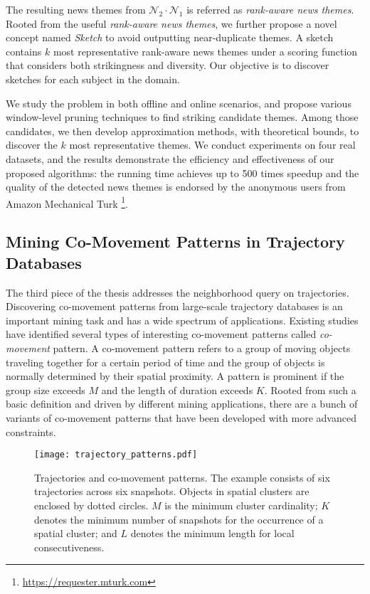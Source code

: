 The resulting news themes from $\mathcal{N}_2 \cdot \mathcal{N}_1$ is referred as \emph{rank-aware news themes}. Rooted from the useful \emph{rank-aware news themes}, we further propose
a novel concept named \emph{Sketch} to avoid outputting near-duplicate themes.
A sketch contains $k$ most representative rank-aware news themes under a scoring function that considers both strikingness and diversity.  Our objective is to discover sketches for each subject in the domain.

We study the problem in both
offline and online scenarios, and propose various window-level 
pruning techniques to find striking candidate themes.
Among those candidates, we then develop approximation
methods, with theoretical bounds, to discover the $k$ most
representative themes. We conduct experiments on four real
datasets, and the results demonstrate the efficiency and 
effectiveness of our proposed algorithms: the running time
achieves up to 500 times speedup and the quality of the
detected news themes is endorsed by the anonymous users
from Amazon Mechanical Turk \footnote{\url{https://requester.mturk.com}}.

\subsection{Mining Co-Movement Patterns in Trajectory Databases}
The third piece of the thesis addresses the neighborhood
query on trajectories.
Discovering co-movement patterns from large-scale trajectory 
databases is an important mining task and has a wide
spectrum of applications. 
Existing studies have identified several types of interesting co-movement patterns called \emph{co-movement} pattern. A co-movement pattern refers to a group of moving objects traveling together for a certain period of time and the group of objects is normally determined by their spatial proximity. A pattern is prominent if the group size exceeds $M$ and the length of duration exceeds $K$. 
Rooted from such a basic definition 
and driven by different mining applications, there are a bunch of variants 
of co-movement patterns that have been developed with more advanced constraints.

\begin{figure}[h]
\centering
\texttt{[image: trajectory\_patterns.pdf]}
\caption{Trajectories and co-movement patterns. The example consists of six trajectories across six snapshots. Objects in spatial clusters are enclosed by dotted circles. $M$ is the minimum cluster cardinality; $K$ denotes the minimum number of snapshots for the occurrence of a spatial cluster; and $L$ denotes the minimum length for local consecutiveness.}
\label{fig:related_work}
\end{figure}

